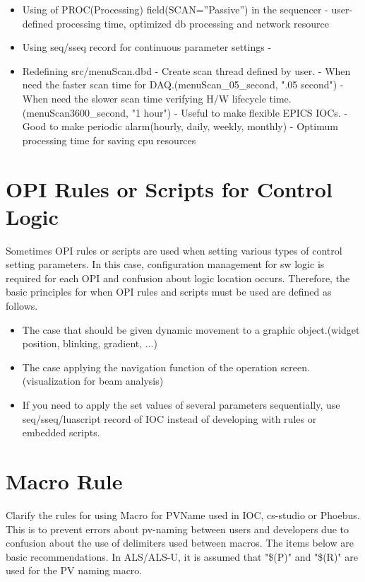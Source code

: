 \documentclass[11pt
  , letterpaper
  , article
  , oneside
  , showtrims
]{memoir}
\begin{document}
\begin{itemize}
	\item Using of PROC(Processing) field(SCAN=”Passive”) in the sequencer
	\newline
	- user-defined processing time, optimized db processing and network resource
	\item Using seq/sseq record for continuous parameter settings
	\newline
	- 
	\item Redefining src/menuScan.dbd
	\newline
	- Create scan thread defined by user.
	\newline
	- When need the faster scan time for DAQ.(menuScan\_05\_second, ".05 second")
	\newline
	- When need the slower scan time verifying H/W lifecycle time.(menuScan3600\_second, "1 hour")
	\newline
	- Useful to make flexible EPICS IOCs.
	\newline
	- Good to make periodic alarm(hourly, daily, weekly, monthly)
	\newline
	- Optimum processing time for saving cpu resources
\end{itemize}

\section{OPI Rules or Scripts for Control Logic}
Sometimes OPI rules or scripts are used when setting various types of control setting parameters. In this case, configuration management for sw logic is required for each OPI and confusion about logic location occurs. Therefore, the basic principles for when OPI rules and scripts must be used are defined as follows.

\begin{itemize}
	\item The case that should be given dynamic movement to a graphic object.(widget position, blinking, gradient, ...)
	\item The case applying the navigation function of the operation screen. (visualization for beam analysis)
	\item If you need to apply the set values of several parameters sequentially, use seq/sseq/luascript record of IOC instead of developing with rules or embedded scripts.
\end{itemize}

\section{Macro Rule}
Clarify the rules for using Macro for PVName used in IOC, cs-studio or Phoebus. This is to prevent errors about pv-naming between users and developers due to confusion about the use of delimiters used between macros. The items below are basic recommendations. In ALS/ALS-U, it is assumed that "\$(P)" and "\$(R)" are used for the PV naming macro.
\end{document}
